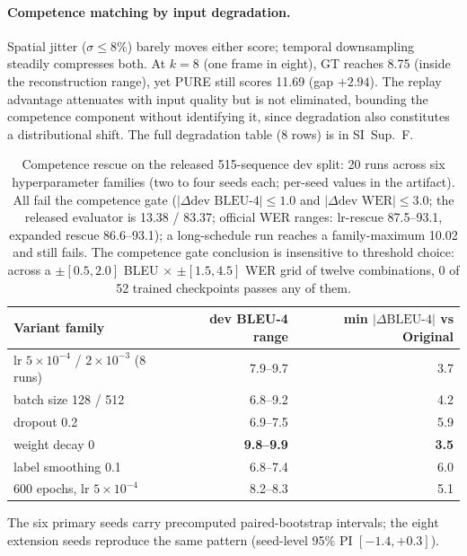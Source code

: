 \documentclass[pdflatex,sn-chicago]{sn-jnl}
\begin{document}
\paragraph{Competence matching by input degradation.}
\label{sec:degradation}
Spatial jitter ($\sigma{\leq}8\%$) barely moves either score; temporal downsampling steadily compresses both. At $k{=}8$ (one frame in eight), GT reaches 8.75 (inside the reconstruction range), yet PURE still scores 11.69 (gap $+2.94$). The replay advantage attenuates with input quality but is not eliminated, bounding the competence component without identifying it, since degradation also constitutes a distributional shift. The full degradation table (8 rows) is in SI~Sup.~F.

\begin{table}[h]
\centering
\small
\caption{Competence rescue on the released 515-sequence dev split: 20 runs across six hyperparameter families (two to four seeds each; per-seed values in the artifact). All fail the competence gate ($|\Delta\text{dev BLEU-4}|\leq 1.0$ and $|\Delta\text{dev WER}|\leq 3.0$; the released evaluator is 13.38 / 83.37; official WER ranges: lr-rescue 87.5--93.1, expanded rescue 86.6--93.1); a long-schedule run reaches a family-maximum 10.02 and still fails. The competence gate conclusion is insensitive to threshold choice: across a $\pm[0.5,2.0]$ BLEU $\times$ $\pm[1.5,4.5]$ WER grid of twelve combinations, 0 of 52 trained checkpoints passes any of them.}
\label{tab:rescue_dev}
\begin{tabular}{lrr}
\toprule
Variant family & dev BLEU-4 range & min $|\Delta\text{BLEU-4}|$ vs Original \\
\midrule
lr $5\times10^{-4}$ / $2\times10^{-3}$ (8 runs) & 7.9--9.7 & 3.7 \\
batch size 128 / 512 & 6.8--9.2 & 4.2 \\
dropout 0.2 & 6.9--7.5 & 5.9 \\
weight decay 0 & \textbf{9.8--9.9} & \textbf{3.5} \\
label smoothing 0.1 & 6.8--7.4 & 6.0 \\
600 epochs, lr $5\times10^{-4}$ & 8.2--8.3 & 5.1 \\
\bottomrule
\end{tabular}
\end{table}



The six primary seeds carry precomputed paired-bootstrap intervals; the eight extension seeds reproduce the same pattern (seed-level 95\% PI $[-1.4,+0.3]$).
\end{document}
